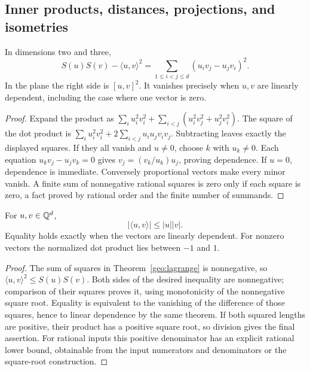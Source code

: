 \subsection{Inner products, distances, projections, and isometries}

\begin{theorem}
\label{geo:lagrange}
In dimensions two and three,
\[
 S(u)S(v)-\langle u,v\rangle^2
 =\sum_{1\le i<j\le d}(u_iv_j-u_jv_i)^2.
\]
In the plane the right side is $[u,v]^2$. It vanishes precisely when $u,v$
are linearly dependent, including the case where one vector is zero.
\end{theorem}
\begin{proof}
Expand the product as
$\sum_i u_i^2v_i^2+\sum_{i<j}(u_i^2v_j^2+u_j^2v_i^2)$.
The square of the dot product is
$\sum_i u_i^2v_i^2+2\sum_{i<j}u_iu_jv_iv_j$.
Subtracting leaves exactly the displayed squares. If they all vanish and
$u\ne0$, choose $k$ with $u_k\ne0$. Each equation
$u_kv_j-u_jv_k=0$ gives $v_j=(v_k/u_k)u_j$, proving dependence.
If $u=0$, dependence is immediate. Conversely proportional vectors make
every minor vanish. A finite sum of nonnegative rational squares is zero
only if each square is zero, a fact proved by rational order and the finite
number of summands.
\end{proof}

\begin{theorem}
\label{geo:cauchy}
For $u,v\in\mathbb Q^d$,
\[
 |\langle u,v\rangle|\le |u||v|.
\]
Equality holds exactly when the vectors are linearly dependent. For nonzero
vectors the normalized dot product lies between $-1$ and $1$.
\end{theorem}
\begin{proof}
The sum of squares in Theorem~\ref{geo:lagrange} is nonnegative, so
$\langle u,v\rangle^2\le S(u)S(v)$. Both sides of the desired inequality
are nonnegative; comparison of their squares proves it, using monotonicity
of the nonnegative square root. Equality is equivalent to the vanishing
of the difference of those squares, hence to linear dependence by the same
theorem. If both squared lengths are positive, their product has a positive
square root, so division gives the final assertion. For rational inputs this
positive denominator has an explicit rational lower bound, obtainable from
the input numerators and denominators or the square-root construction.
\end{proof}


